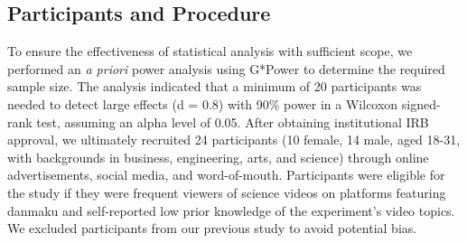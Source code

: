 

\subsection{Participants and Procedure}
To ensure the effectiveness of statistical analysis with sufficient scope, 
we performed an \textit{a priori} power analysis using G*Power \cite{faul2007g} to determine the required sample size. The analysis indicated that a minimum of 20 participants was needed to detect large effects (d = 0.8) with 90\% power in a Wilcoxon signed-rank test, assuming an alpha level of 0.05. After obtaining institutional IRB approval, we ultimately recruited 24 participants (10 female, 14 male, aged 18-31, with backgrounds in business, engineering, arts, and science) through online advertisements, social media, and word-of-mouth. 
Participants were eligible for the study if they were frequent viewers of science videos on platforms featuring danmaku and self-reported low prior knowledge of the experiment's video topics. 
We excluded participants from our previous study to avoid potential bias.

